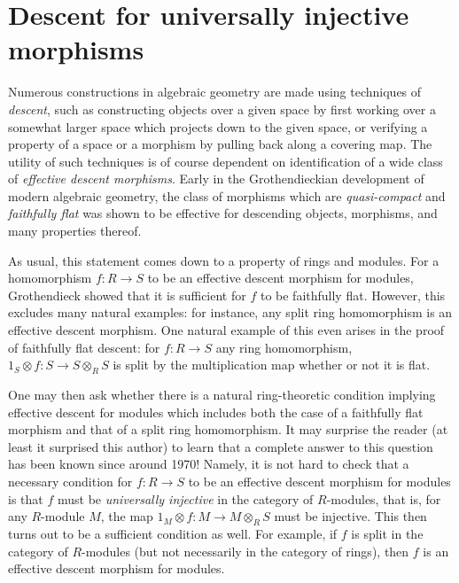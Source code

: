 \section{Descent for universally injective morphisms}
\label{descent-section-descent-universally-injective}
Numerous constructions in algebraic geometry are made using techniques of
{\it descent}, such as constructing objects over a given space by first
working over a somewhat larger space which projects down to the given space,
or verifying a property of a space or a morphism by pulling back along a
covering map. The utility of such techniques is of course  dependent on
identification of a wide class of {\it effective descent morphisms}.
Early in the Grothendieckian development of modern algebraic geometry,
the class of morphisms which are {\it quasi-compact} and {\it faithfully flat}
was shown to be effective for descending objects, morphisms, and many
properties thereof.

\medskip\noindent
As usual, this statement comes down to a property of rings and modules.
For a homomorphism $f: R \to S$ to be an effective descent morphism for
modules, Grothendieck showed that it is sufficient for $f$ to be
faithfully flat. However, this excludes many natural examples: for instance,
any split ring homomorphism is an effective descent morphism. One natural
example of this even arises in the proof of faithfully flat descent: for
$f: R \to S$ any ring homomorphism, $1_S \otimes f: S \to S \otimes_R S$
is split by the multiplication map whether or not it is flat.

\medskip\noindent
One may then ask whether there is a natural ring-theoretic condition
implying effective descent for modules which includes both the case of a
faithfully flat morphism and that of a split ring homomorphism. It may
surprise the reader (at least it surprised this author) to learn that a
complete answer to this question has been known since around 1970! Namely,
it is not hard to check that a necessary condition for $f: R \to S$ to be
an effective descent morphism for modules is that $f$ must be
{\it universally injective} in the category of $R$-modules, that is, for
any $R$-module $M$, the map $1_M  \otimes f: M \to M \otimes_R S$
must be injective. This then turns out to be a sufficient condition as well.
For example, if $f$ is split in the category of $R$-modules (but not
necessarily in the category of rings), then $f$ is an effective descent
morphism for modules.

